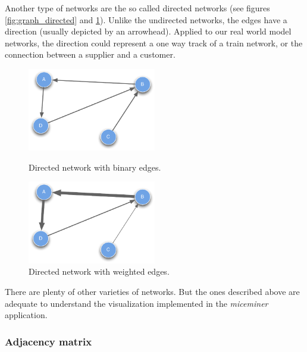 Another type of networks are the so called directed networks (see figures \ref{fig:graph_directed} and \ref{fig:graph_directed_weighted}). Unlike the undirected networks, the edges have a direction (usually depicted by an arrowhead). Applied to our real world model networks, the direction could represent a one way track of a train network, or the connection between a supplier and a customer. 

\begin{figure}[htbp]
	\begin{minipage}[b]{0.5\textwidth}
    	\captionsetup{width=.5\textwidth}
		\centering
			\includegraphics[width=0.5\textwidth]{assets/pdf/graph_directed.pdf}
			\caption{Directed network with binary edges.}
			\label{fig:graph_directed}
	\end{minipage}
	\hspace{0.5cm}
	\begin{minipage}[b]{0.5\textwidth}
    \captionsetup{width=.5\textwidth}
		\centering
			\includegraphics[width=0.5\textwidth]{assets/pdf/graph_directed_weighted.pdf}
			\caption{Directed network with weighted edges.}
			\label{fig:graph_directed_weighted}
	\end{minipage}
\end{figure}

There are plenty of other varieties of networks. But the ones described above are adequate to understand the visualization implemented in the \textit{miceminer} application.

\subsubsection{Adjacency matrix}
\label{subsubsec:adjacency_matrix}

